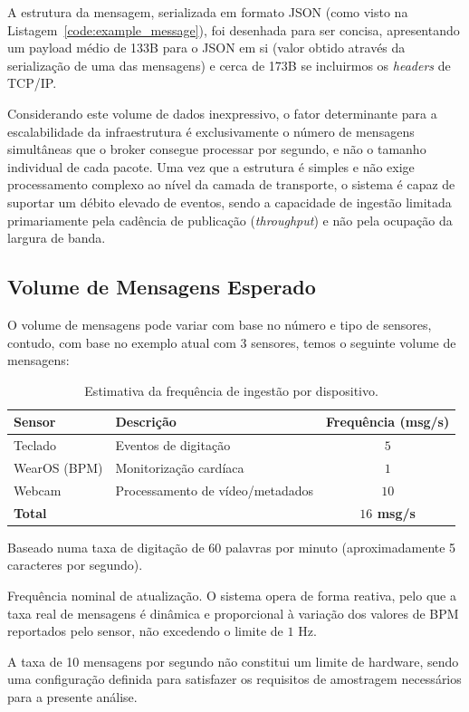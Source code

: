 A estrutura da mensagem, serializada em formato JSON (como visto na Listagem~\ref{code:example_message}), foi desenhada para ser concisa, apresentando um payload médio de 133B para o JSON em si (valor obtido através da serialização de uma das mensagens) e cerca de 173B se incluirmos os \textit{headers} de TCP/IP.

Considerando este volume de dados inexpressivo, o fator determinante para a escalabilidade da infraestrutura é exclusivamente o número de mensagens simultâneas que o broker consegue processar por segundo, e não o tamanho individual de cada pacote. Uma vez que a estrutura é simples e não exige processamento complexo ao nível da camada de transporte, o sistema é capaz de suportar um débito elevado de eventos, sendo a capacidade de ingestão limitada primariamente pela cadência de publicação (\textit{throughput}) e não pela ocupação da largura de banda.

\subsection{Volume de Mensagens Esperado}

O volume de mensagens pode variar com base no número e tipo de sensores, contudo, com base no exemplo atual com 3 sensores, temos o seguinte volume de mensagens:
    
\begin{table}[h]
\centering
\begin{threeparttable}
\caption{Estimativa da frequência de ingestão por dispositivo.}
\label{tab:sensor_throughput}
\begin{tabular}{llc}
\toprule
\textbf{Sensor} & \textbf{Descrição} & \textbf{Frequência (msg/s)} \\ 
\midrule
Teclado\tnote{1} & Eventos de digitação & $5$ \\
WearOS\tnote{2} (\ac{BPM}) & Monitorização cardíaca & $1$ \\
Webcam\tnote{3} & Processamento de vídeo/metadados & $10$ \\ 
\midrule
\textbf{Total} & & \textbf{$16$ msg/s} \\ 
\bottomrule
\end{tabular}
\begin{tablenotes}
    \small
    \item[1] Baseado numa taxa de digitação de 60 palavras por minuto (aproximadamente 5 caracteres por segundo).
    \item[2] Frequência nominal de atualização. O sistema opera de forma reativa, pelo que a taxa real de mensagens é dinâmica e proporcional à variação dos valores de \ac{BPM} reportados pelo sensor, não excedendo o limite de $1$ Hz.
    \item[3] A taxa de 10 mensagens por segundo não constitui um limite de hardware, sendo uma configuração definida para satisfazer os requisitos de amostragem necessários para a presente análise.
\end{tablenotes}
\end{threeparttable}
\end{table}

